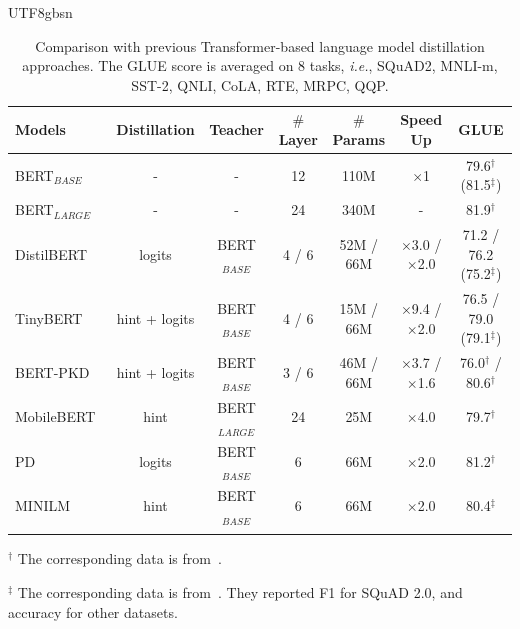 \documentclass[10pt,journal,compsoc]{IEEEtran}
\newcommand{\ie}{\emph{i.e.}}
\newcommand{\<}{\left\langle}
\renewcommand{\>}{\right\rangle}
\newcommand{\1}{\mathbbm{1}}
\begin{document}
\begin{CJK}{UTF8}{gbsn}
\begin{table}[t]
	\centering
	\small
	\renewcommand\arraystretch{1.0}
	\setlength{\tabcolsep}{6pt}
	\caption{\small{Comparison with previous Transformer-based language model distillation approaches. The GLUE score is averaged on 8 tasks, \ie, SQuAD2, MNLI-m, SST-2, QNLI, CoLA, RTE, MRPC, QQP.}}
	\vspace{-0.5em}
	\begin{tabular}{l|c|c|c|c|c|c}
		\Xhline{1pt}
		Models & Distillation & Teacher & $\#$ Layer & $\#$ Params & Speed Up & GLUE \\		
		\hline
		BERT$_{BASE}$~\cite{devlin2018bert}  & - & - & 12 & 110M & $\times$1 & 79.6$^\dagger$ (81.5$^\ddagger$) \\
		BERT$_{LARGE}$~\cite{devlin2018bert} & - & - & 24 & 340M & - & 81.9$^\dagger$ \\
		\hline
		DistilBERT~\cite{sanh2019distilbert} & logits & BERT$_{BASE}$ & 4 / 6 & 52M / 66M & $\times$3.0 / $\times$2.0 & 71.2 / 76.2 (75.2$^\ddagger$) \\
		TinyBERT~\cite{jiao2019tinybert} & hint + logits & BERT$_{BASE}$ & 4 / 6 & 15M / 66M & $\times$9.4 / $\times$2.0 & 76.5 / 79.0 (79.1$^\ddagger$) \\
		BERT-PKD~\cite{sun2019patient} & hint + logits & BERT$_{BASE}$ & 3 / 6 & 46M / 66M & $\times$3.7 / $\times$1.6 & 76.0$^\dagger$ / 80.6$^\dagger$ \\
		MobileBERT~\cite{sun2020mobilebert} & hint & BERT$_{LARGE}$ & 24 & 25M & $\times$4.0 & 79.7$^\dagger$ \\
		PD~\cite{turc2019well} & logits & BERT$_{BASE}$ & 6 & 66M & $\times$2.0 & 81.2$^\dagger$ \\
		MINILM~\cite{gu2023knowledge} & hint & BERT$_{BASE}$ & 6 & 66M & $\times$2.0 & 80.4$^\ddagger$ \\
		\Xhline{1pt}
	\end{tabular}
	\label{table:kd_bert}
	\begin{tablenotes}
		\item $^\dagger$ The corresponding data is from~\cite{qiu2020pre}.
		\item $^\ddagger$ The corresponding data is from~\cite{gu2023knowledge}. They reported F1 for SQuAD 2.0, and accuracy for other datasets.
	\end{tablenotes}
\end{table}



\end{CJK}
\end{document}
